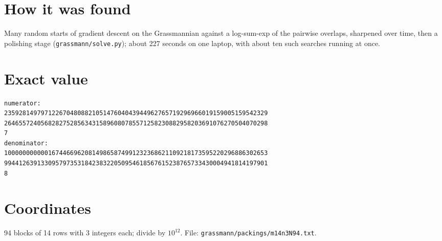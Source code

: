 \documentclass[11pt,a4paper]{article}
\begin{document}
\section{How it was found}
Many random starts of gradient descent on the Grassmannian against a log-sum-exp of the pairwise overlaps, sharpened over time, then a polishing stage (\texttt{grassmann/solve.py}); about 227 seconds on one laptop, with about ten such searches running at once.


\appendix
\section{Exact value}
{\small
\begin{verbatim}
numerator:
235928149797122670480882105147604043944962765719296966019159005159542329
264655724056828275285634315896080785571258230882958203691076270504070298
7
denominator:
100000000000167446696208149865874991232368621109218173595220296886302653
994412639133095797353184238322050954618567615238765733430004941814197901
8
\end{verbatim}}

\section{Coordinates}
94 blocks of 14 rows with 3 integers each; divide by $10^{12}$. File: \texttt{grassmann/packings/m14n3N94.txt}.
{\tiny
\begin{multicols}{3}
\end{multicols}}
\end{document}
